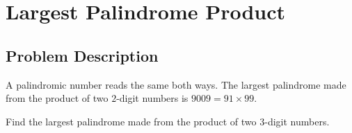 \chapter{Largest Palindrome Product}
\section{Problem Description}
\begin{tcolorbox}
A palindromic number reads the same both ways. The largest palindrome made from the product of two $2$-digit numbers is $9009 = 91 \times 99$.

Find the largest palindrome made from the product of two $3$-digit numbers.
\end{tcolorbox}
